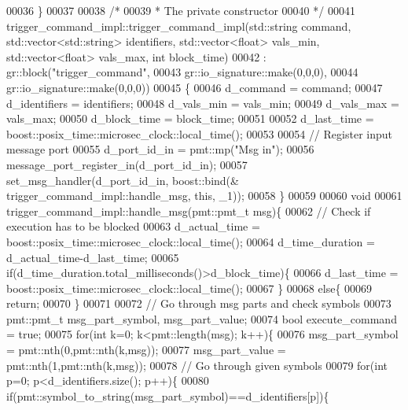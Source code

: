 \begin{DoxyCode}
00036     \}
00037 
00038     \textcolor{comment}{/*}
00039 \textcolor{comment}{     * The private constructor}
00040 \textcolor{comment}{     */}
00041     trigger_command_impl::trigger_command_impl(std::string command, std::vector<std::string> identifiers, 
      std::vector<float> vals\_min, std::vector<float> vals\_max, \textcolor{keywordtype}{int} block\_time)
00042       : gr::block(\textcolor{stringliteral}{"trigger\_command"},
00043               gr::io\_signature::make(0,0,0),
00044               gr::io\_signature::make(0,0,0))
00045     \{
00046         d_command = command;
00047         d_identifiers = identifiers;
00048         d_vals_min = vals\_min;
00049         d_vals_max = vals\_max;
00050         d_block_time = block\_time;
00051         
00052         d_last_time = boost::posix\_time::microsec\_clock::local\_time();
00053         
00054         \textcolor{comment}{// Register input message port}
00055         d_port_id_in = pmt::mp(\textcolor{stringliteral}{"Msg in"});
00056         message\_port\_register\_in(d_port_id_in);
00057         set\_msg\_handler(d_port_id_in, boost::bind(&
      trigger_command_impl::handle_msg, \textcolor{keyword}{this}, \_1));
00058     \}
00059     
00060     \textcolor{keywordtype}{void}
00061     trigger_command_impl::handle_msg(pmt::pmt\_t msg)\{
00062         \textcolor{comment}{// Check if execution has to be blocked}
00063         d_actual_time = boost::posix\_time::microsec\_clock::local\_time();
00064         d_time_duration = d_actual_time-d_last_time;
00065         \textcolor{keywordflow}{if}(d_time_duration.total\_milliseconds()>d_block_time)\{
00066             d\_last\_time = boost::posix\_time::microsec\_clock::local\_time();
00067         \}
00068         \textcolor{keywordflow}{else}\{
00069             \textcolor{keywordflow}{return};
00070         \}
00071         
00072         \textcolor{comment}{// Go through msg parts and check symbols}
00073         pmt::pmt\_t msg\_part\_symbol, msg\_part\_value;
00074         \textcolor{keywordtype}{bool} execute\_command = \textcolor{keyword}{true};
00075         \textcolor{keywordflow}{for}(\textcolor{keywordtype}{int} k=0; k<pmt::length(msg); k++)\{
00076             msg\_part\_symbol = pmt::nth(0,pmt::nth(k,msg));
00077             msg\_part\_value = pmt::nth(1,pmt::nth(k,msg));
00078             \textcolor{comment}{// Go through given symbols}
00079             \textcolor{keywordflow}{for}(\textcolor{keywordtype}{int} p=0; p<d_identifiers.size(); p++)\{
00080                 \textcolor{keywordflow}{if}(pmt::symbol\_to\_string(msg\_part\_symbol)==d_identifiers[p])\{

\end{DoxyCode}
